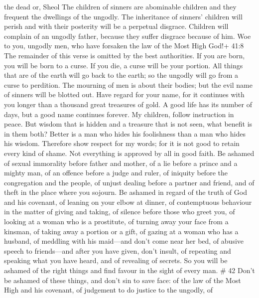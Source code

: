 the dead or, Sheol  The children of sinners are abominable
children and they frequent the dwellings of the ungodly. 
The inheritance of sinners' children will perish and with their
posterity will be a perpetual disgrace.  Children will
complain of an ungodly father, because they suffer disgrace because of
him.  Woe to you, ungodly men, who have forsaken the law of
the Most High God!+ 41:8 The remainder of this verse is omitted by the
best authorities.  If you are born, you will be born to a
curse. If you die, a curse will be your portion.  All
things that are of the earth will go back to the earth; so the ungodly
will go from a curse to perdition.  The mourning of men is
about their bodies; but the evil name of sinners will be blotted out.
 Have regard for your name, for it continues with you
longer than a thousand great treasures of gold.  A good
life has its number of days, but a good name continues forever.
 My children, follow instruction in peace. But wisdom that
is hidden and a treasure that is not seen, what benefit is in them both?
 Better is a man who hides his foolishness than a man who
hides his wisdom.  Therefore show respect for my words; for
it is not good to retain every kind of shame. Not everything is approved
by all in good faith.  Be ashamed of sexual immorality
before father and mother, of a lie before a prince and a mighty man,
 of an offence before a judge and ruler, of iniquity before
the congregation and the people, of unjust dealing before a partner and
friend,  and of theft in the place where you sojourn. Be
ashamed in regard of the truth of God and his covenant, of leaning on
your elbow at dinner, of contemptuous behaviour in the matter of giving
and taking,  of silence before those who greet you, of
looking at a woman who is a prostitute,  of turning away
your face from a kinsman, of taking away a portion or a gift, of gazing
at a woman who has a husband,  of meddling with his
maid---and don't come near her bed, of abusive speech to friends---and
after you have given, don't insult,  of repeating and
speaking what you have heard, and of revealing of secrets. 
So you will be ashamed of the right things and find favour in the sight
of every man. \# 42  Don't be ashamed of these things, and
don't sin to save face:  of the law of the Most High and his
covenant, of judgement to do justice to the ungodly,  of
